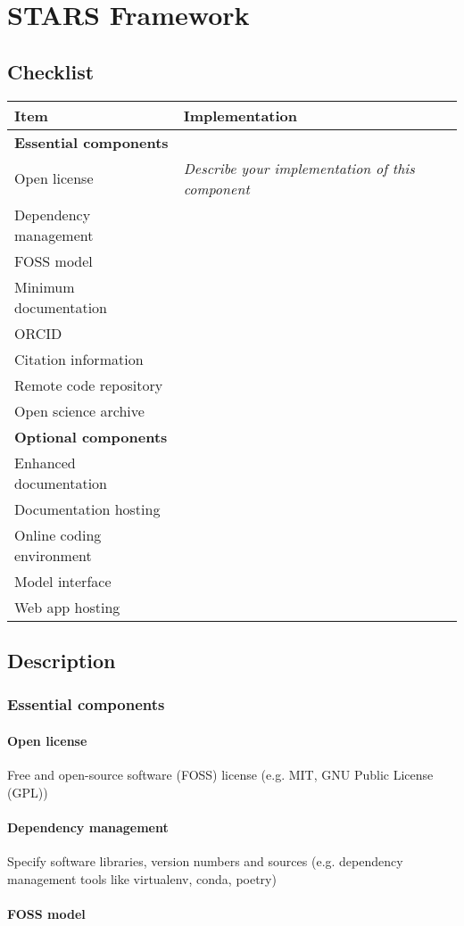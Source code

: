 \documentclass[
]{article}
\author{}
\date{}
\begin{document}
\section{STARS Framework}

\subsection{Checklist}

\begin{longtable}[]{@{}ll@{}}
\toprule
Item & Implementation\tabularnewline
\midrule
\endhead
\textbf{Essential components} &\tabularnewline
Open license & \emph{Describe your implementation of this
component}\tabularnewline
Dependency management &\tabularnewline
FOSS model &\tabularnewline
Minimum documentation &\tabularnewline
ORCID &\tabularnewline
Citation information &\tabularnewline
Remote code repository &\tabularnewline
Open science archive &\tabularnewline
\textbf{Optional components} &\tabularnewline
Enhanced documentation &\tabularnewline
Documentation hosting &\tabularnewline
Online coding environment &\tabularnewline
Model interface &\tabularnewline
Web app hosting &\tabularnewline
\bottomrule
\end{longtable}

\subsection{Description}

\subsubsection{Essential components}

\paragraph{Open license}

Free and open-source software (FOSS) license (e.g. MIT, GNU Public
License (GPL))

\paragraph{Dependency management}

Specify software libraries, version numbers and sources (e.g. dependency
management tools like virtualenv, conda, poetry)

\paragraph{FOSS model}
\end{document}
